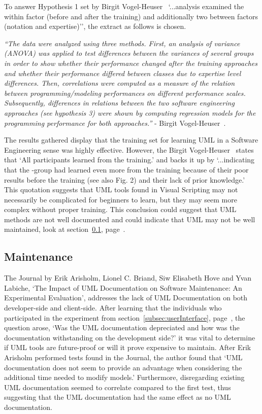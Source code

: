 \documentclass[12pt]{report} %
\begin{document}
			\newpage
			To answer Hypothesis 1 set by Birgit Vogel-Heuser~\cite{vogel-heuser_evaluation_2013} `...analysis examined the within factor (before and after the training) and additionally two between factors (notation and expertise)'', the extract as follows is chosen.
			\begin{center}
				\textit{``The data were analyzed using three methods. First, an analysis of variance (ANOVA) was applied to test differences between the variances of several groups in order to show whether their performance changed after the training approaches and whether their performance differed between classes due to expertise level differences. Then, correlations were computed as a measure of the relation between programming/modeling performances on different performance scales. Subsequently, differences in relations between the two software engineering approaches (see hypothesis 3) were shown by computing regression models for the programming performance for both approaches.''} - Birgit Vogel-Heuser~\cite{vogel-heuser_evaluation_2013}. 
			\end{center}
				
			The results gathered display that the training set for learning UML in a Software Engineering sense was highly effective. However, the Birgit Vogel-Heuser~\cite{vogel-heuser_evaluation_2013} states that `All participants learned from the training.' and backs it up by `...indicating that the -group had learned even more from the training because of their poor results before the training (see also Fig. 2) and their lack of prior knowledge.' This quotation suggests that UML tools found in Visual Scripting may not necessarily be complicated for beginners to learn, but they may seem more complex without proper training. This conclusion could suggest that UML methods are not well documented and could indicate that UML may not be well maintained, look at section~\ref{subsec:maintenance}, page~\pageref{subsec:maintenance}.

		\subsection{Maintenance}
		\label{subsec:maintenance}
			The Journal by Erik Arisholm, Lionel C. Briand, Siw Elisabeth Hove and Yvan Labiche, `The Impact of UML Documentation on Software Maintenance: An Experimental Evaluation', addresses the lack of UML Documentation on both developer-side and client-side. After learning that the individuals who participated in the experiment from section~\ref{subsec:userInterface}, page~\pageref{subsec:userInterface}, the question arose, `Was the UML documentation depreciated and how was the documentation withstanding on the development side?' it was vital to determine if UML tools are future-proof or will it prove expensive to maintain. After Erik Arisholm performed tests found in the Journal, the author found that `UML documentation does not seem to provide an advantage when considering the additional time needed to modify models.' Furthermore, disregarding existing UML documentation seemed to correlate compared to the first test, thus suggesting that the UML documentation had the same effect as no UML documentation.
\end{document}
